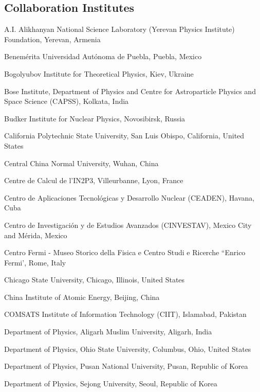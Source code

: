 \begin{flushleft}
\section*{Collaboration Institutes}
\renewcommand\theenumi{\arabic{enumi}~}
\begin{Authlist}
\item {}A.I. Alikhanyan National Science Laboratory (Yerevan Physics Institute) Foundation, Yerevan, Armenia
\item {}Benem\'{e}rita Universidad Aut\'{o}noma de Puebla, Puebla, Mexico
\item {}Bogolyubov Institute for Theoretical Physics, Kiev, Ukraine
\item {}Bose Institute, Department of Physics  and Centre for Astroparticle Physics and Space Science (CAPSS), Kolkata, India
\item {}Budker Institute for Nuclear Physics, Novosibirsk, Russia
\item {}California Polytechnic State University, San Luis Obispo, California, United States
\item {}Central China Normal University, Wuhan, China
\item {}Centre de Calcul de l'IN2P3, Villeurbanne, Lyon, France
\item {}Centro de Aplicaciones Tecnol\'{o}gicas y Desarrollo Nuclear (CEADEN), Havana, Cuba
\item {}Centro de Investigaci\'{o}n y de Estudios Avanzados (CINVESTAV), Mexico City and M\'{e}rida, Mexico
\item {}Centro Fermi - Museo Storico della Fisica e Centro Studi e Ricerche ``Enrico Fermi', Rome, Italy
\item {}Chicago State University, Chicago, Illinois, United States
\item {}China Institute of Atomic Energy, Beijing, China
\item {}COMSATS Institute of Information Technology (CIIT), Islamabad, Pakistan
\item {}Department of Physics, Aligarh Muslim University, Aligarh, India
\item {}Department of Physics, Ohio State University, Columbus, Ohio, United States
\item {}Department of Physics, Pusan National University, Pusan, Republic of Korea
\item {}Department of Physics, Sejong University, Seoul, Republic of Korea

\end{Authlist}
\end{flushleft}
